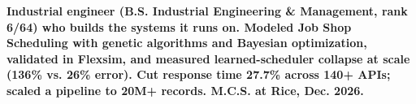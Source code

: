 %
\item\small{\textbf{Industrial engineer (\textbf{B.S. Industrial Engineering \& Management}, rank \textbf{6/64}) who builds the systems it runs on. Modeled Job Shop Scheduling with genetic algorithms and Bayesian optimization, validated in \textbf{Flexsim}, and measured learned-scheduler collapse at scale (\textbf{136\%} vs. \textbf{26\%} error). Cut response time \textbf{27.7\%} across \textbf{140+} APIs; scaled a pipeline to \textbf{20M+} records. M.C.S. at Rice, Dec. 2026.}}%
